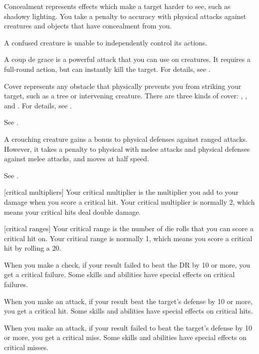  Concealment represents effects which make a target harder to see, such as shadowy lighting.
You take a  penalty to accuracy with physical attacks against creatures and objects that have concealment from you.

 A confused creature is unable to independently control its actions. \confusionexplanation

 A coup de grace is a powerful attack that you can use on \helpless creatures.
It requires a full-round action, but can instantly kill the target.
For details, see .

 Cover represents any obstacle that physically prevents you from striking your target, such as a tree or intervening creature.
There are three kinds of cover: , , and .
For details, see .

 See .

 A crouching creature gains a  bonus to physical defenses against ranged attacks.
However, it takes a  penalty to physical  with melee attacks and physical defenses against melee attacks, and moves at half speed.

 See .

[critical multipliers] Your critical multiplier is the multiplier you add to your damage when you score a critical hit.
Your critical multiplier is normally 2, which means your critical hits deal double damage.

[critical ranges] Your critical range is the number of die rolls that you can score a critical hit on.
Your critical range is normally 1, which means you score a critical hit by rolling a 20.

 When you make a check, if your result failed to beat the DR by 10 or more, you get a critical failure.
Some skills and abilities have special effects on critical failures.

 When you make an attack, if your result beat the target's defense by 10 or more, you get a critical hit.
Some skills and abilities have special effects on critical hits.

 When you make an attack, if your result failed to beat the target's defense by 10 or more, you get a critical miss.
Some skills and abilities have special effects on critical misses.

